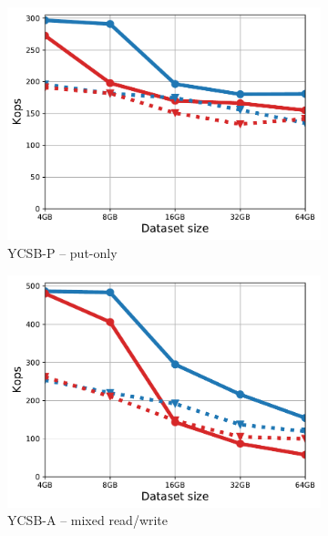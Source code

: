 \begin{figure}[tb]
\centering
\begin{subfigure}{0.3\linewidth}
\includegraphics[width=\textwidth]{figs/Workload_P_line.pdf}
\caption{YCSB-P -- put-only}
\label{fig:throughput:p}
\end{subfigure}
\begin{subfigure}{0.3\linewidth}
\includegraphics[width=\textwidth]{figs/Workload_A_line.pdf}
\caption{YCSB-A -- mixed read/write}
\label{fig:throughput:a}
\end{subfigure}
\begin{subfigure}{0.3\linewidth}

\end{subfigure}
\end{figure}

